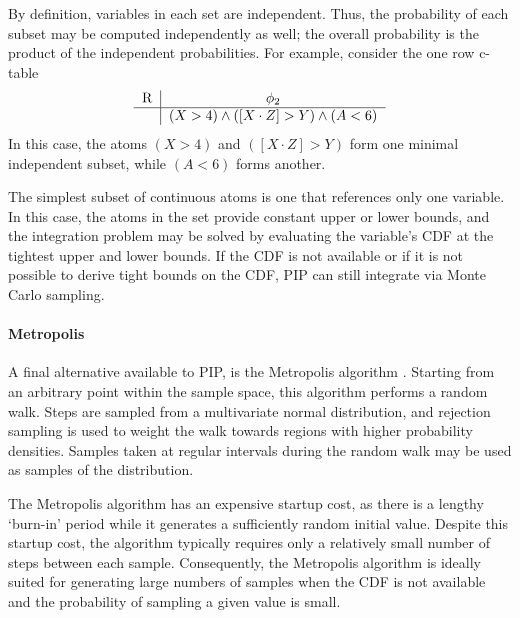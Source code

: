 By definition, variables in each set are independent.  Thus, the probability of each subset may be computed independently as well; the overall probability is the product of the independent probabilities.  For example, consider the one row c-table 
\[
\begin{tabular}{c|c}
R & $\phi_2$ \\
\hline
& $(X > 4) \wedge ([X\cdot Z] > Y) \wedge (A < 6)$ \\
\end{tabular}
\]
In this case, the atoms $(X > 4)$ and $([X\cdot Z] > Y)$ form one minimal independent subset, while $(A < 6)$ forms another.


The simplest subset of continuous atoms is one that references only one variable.  In this case, the atoms in the set provide constant upper or lower bounds, and the integration problem may be solved by evaluating the variable's CDF at the tightest upper and lower bounds.  If the CDF is not available or if it is not possible to derive tight bounds on the CDF, PIP can still integrate via Monte Carlo sampling.  

\paragraph{Metropolis}
A final alternative available to PIP, is the
Metropolis  algorithm \cite{metropolis}.   Starting from  an arbitrary
point within the sample space,  this algorithm performs a random walk.
Steps  are  sampled  from  a  multivariate  normal  distribution,  and
rejection sampling  is used  to weight the  walk towards  regions with
higher  probability  densities.  Samples  taken  at regular  intervals
during the random walk may be used as samples of the distribution.

The Metropolis algorithm has an  expensive startup cost, as there is a
lengthy  `burn-in' period  while  it generates  a sufficiently  random
initial  value.  Despite  this startup  cost, the  algorithm typically
requires only a relatively small  number of steps between each sample.
Consequently,   the  Metropolis  algorithm   is  ideally   suited  for
generating large numbers of samples  when the CDF is not available and
the probability of sampling a given value is small.

